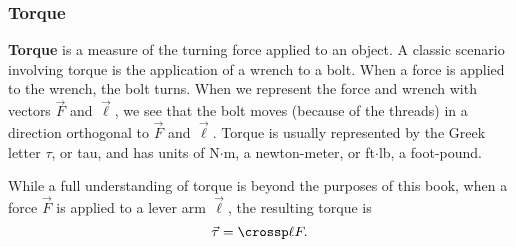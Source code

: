 
\subsubsection{Torque}

\textbf{Torque} is a measure of the turning force applied to an object. A classic scenario involving torque is the application of a wrench to a bolt. When a force is applied to the wrench, the bolt turns. When we represent the force and wrench with vectors $\vec F$ and $\vec \ell$, we see that the bolt moves (because of the threads) in a  direction orthogonal to $\vec F$ and $\vec \ell$. Torque is usually represented by the Greek letter $\tau$, or tau, and has units of N$\cdot$m, a newton-meter, or ft$\cdot$lb, a foot-pound.

While a full understanding of torque is beyond the purposes of this book, when a force $\vec F$ is applied to a lever arm $\vec \ell$, the resulting torque is \begin{equation}\vec \tau = \crossp \ell F.\label{eq:crossp3}\end{equation}

